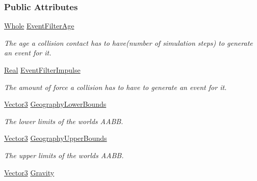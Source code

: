 \subsubsection*{Public Attributes}
\begin{DoxyCompactItemize}
\item 
\hypertarget{classphys_1_1PhysicsConstructionInfo_a8e6ad425c2010f7db9a45111c1ed39c5}{
\hyperlink{namespacephys_a460f6bc24c8dd347b05e0366ae34f34a}{Whole} \hyperlink{classphys_1_1PhysicsConstructionInfo_a8e6ad425c2010f7db9a45111c1ed39c5}{EventFilterAge}}
\label{classphys_1_1PhysicsConstructionInfo_a8e6ad425c2010f7db9a45111c1ed39c5}

\begin{DoxyCompactList}\small\item\em The age a collision contact has to have(number of simulation steps) to generate an event for it. \item\end{DoxyCompactList}\item 
\hypertarget{classphys_1_1PhysicsConstructionInfo_a710a01f32882ae90b71e66ea84642898}{
\hyperlink{namespacephys_af7eb897198d265b8e868f45240230d5f}{Real} \hyperlink{classphys_1_1PhysicsConstructionInfo_a710a01f32882ae90b71e66ea84642898}{EventFilterImpulse}}
\label{classphys_1_1PhysicsConstructionInfo_a710a01f32882ae90b71e66ea84642898}

\begin{DoxyCompactList}\small\item\em The amount of force a collision has to have to generate an event for it. \item\end{DoxyCompactList}\item 
\hyperlink{classphys_1_1Vector3}{Vector3} \hyperlink{classphys_1_1PhysicsConstructionInfo_ab45b8f19cf4d10351a8ea5ecce56363a}{GeographyLowerBounds}
\begin{DoxyCompactList}\small\item\em The lower limits of the worlds AABB. \item\end{DoxyCompactList}\item 
\hyperlink{classphys_1_1Vector3}{Vector3} \hyperlink{classphys_1_1PhysicsConstructionInfo_aca489cc9e35eeb816ad3d0d069c29688}{GeographyUpperBounds}
\begin{DoxyCompactList}\small\item\em The upper limits of the worlds AABB. \item\end{DoxyCompactList}\item 
\hypertarget{classphys_1_1PhysicsConstructionInfo_a213ced8debbdd59a2a489298f292182c}{
\hyperlink{classphys_1_1Vector3}{Vector3} \hyperlink{classphys_1_1PhysicsConstructionInfo_a213ced8debbdd59a2a489298f292182c}{Gravity}}
\label{classphys_1_1PhysicsConstructionInfo_a213ced8debbdd59a2a489298f292182c}


\end{DoxyCompactItemize}
